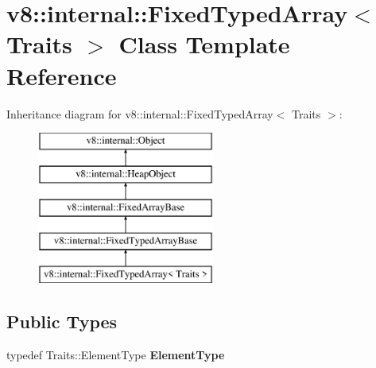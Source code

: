 \hypertarget{classv8_1_1internal_1_1_fixed_typed_array}{}\section{v8\+:\+:internal\+:\+:Fixed\+Typed\+Array$<$ Traits $>$ Class Template Reference}
\label{classv8_1_1internal_1_1_fixed_typed_array}
Inheritance diagram for v8\+:\+:internal\+:\+:Fixed\+Typed\+Array$<$ Traits $>$\+:\begin{figure}[H]
\begin{center}
\leavevmode
\includegraphics[height=5.000000cm]{classv8_1_1internal_1_1_fixed_typed_array}
\end{center}
\end{figure}
\subsection*{Public Types}
\begin{DoxyCompactItemize}
\item 
\hypertarget{classv8_1_1internal_1_1_fixed_typed_array_afa6365d991229911088bf53ea95efb70}{}typedef Traits\+::\+Element\+Type {\bfseries Element\+Type}\label{classv8_1_1internal_1_1_fixed_typed_array_afa6365d991229911088bf53ea95efb70}

\end{DoxyCompactItemize}
